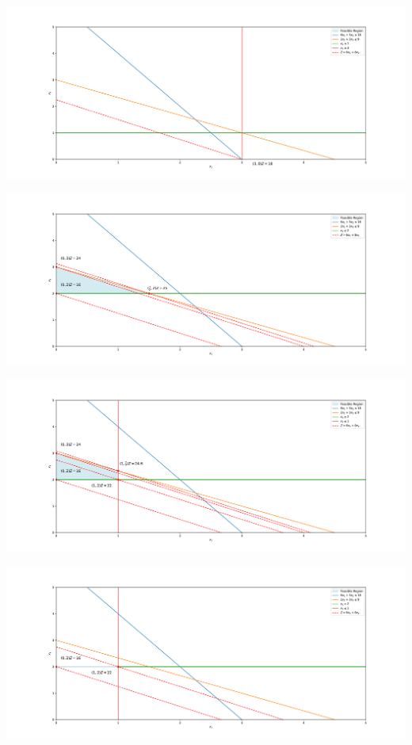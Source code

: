 \begin{center}
    \includegraphics[width = \textwidth]{Exercice/PY/EX1/ex1.4.pdf}
\end{center}
\begin{center}
    \includegraphics[width = \textwidth]{Exercice/PY/EX1/ex1.5.pdf}
\end{center}
\begin{center}
    \includegraphics[width = \textwidth]{Exercice/PY/EX1/ex1.6.pdf}
\end{center}
\begin{center}
    \includegraphics[width = \textwidth]{Exercice/PY/EX1/ex1.7.pdf}
\end{center}
